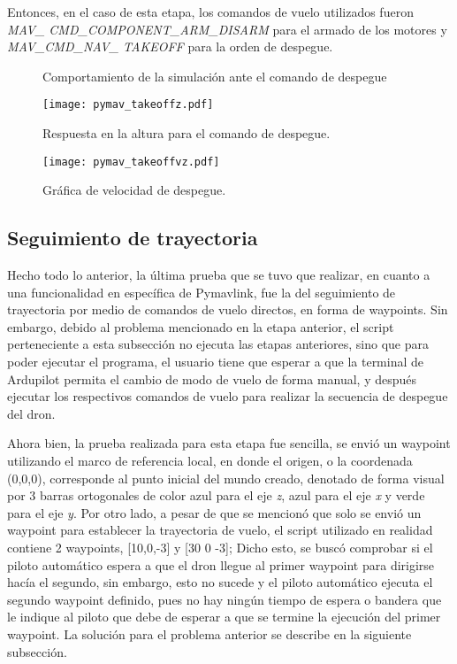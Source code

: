 Entonces, en el caso de esta etapa, los comandos de vuelo utilizados fueron \textit{MAV\_ CMD\_COMPONENT\_ARM\_DISARM} para el armado de los motores y \textit{MAV\_CMD\_NAV\_ TAKEOFF} para la orden de despegue.

\begin{figure}[ht]
    \centering
    \hfill
    \caption{Comportamiento de la simulación ante el comando de despegue}
    \label{fig:pymav_takeoff}
\end{figure}

\begin{figure}[ht]
    \centering
    \texttt{[image: pymav\_takeoffz.pdf]}
    \caption{Respuesta en la altura para el comando de despegue.}
    \label{fig:pymav_takeoffz}
\end{figure}

\begin{figure}[ht]
    \centering
    \texttt{[image: pymav\_takeoffvz.pdf]}
    \caption{Gráfica de velocidad de despegue.}
    \label{fig:pymav_takeoffvz}
\end{figure}

\subsection{Seguimiento de trayectoria}

Hecho todo lo anterior, la última prueba que se tuvo que realizar, en cuanto a una funcionalidad en específica de Pymavlink, fue la del seguimiento de trayectoria por medio de comandos de vuelo directos, en forma de waypoints. Sin embargo, debido al problema mencionado en la etapa anterior, el script perteneciente a esta subsección no ejecuta las etapas anteriores, sino que para poder ejecutar el programa, el usuario tiene que esperar a que la terminal de Ardupilot permita el cambio de modo de vuelo de forma manual, y después ejecutar los respectivos comandos de vuelo para realizar la secuencia de despegue del dron.

Ahora bien, la prueba realizada para esta etapa fue sencilla, se envió un waypoint utilizando el marco de referencia local, en donde el origen, o la coordenada (0,0,0), corresponde al punto inicial del mundo creado, denotado de forma visual por 3 barras ortogonales de color azul para el eje \textit{z}, azul para el eje \textit{x} y verde para el eje \textit{y}. Por otro lado, a pesar de que se mencionó que solo se envió un waypoint para establecer la trayectoria de vuelo, el script utilizado en realidad contiene 2 waypoints, [10,0,-3] y [30 0 -3]; Dicho esto, se buscó comprobar si el piloto automático espera a que el dron llegue al primer waypoint para dirigirse hacía el segundo, sin embargo, esto no sucede y el piloto automático ejecuta el segundo waypoint definido, pues no hay ningún tiempo de espera o bandera que le indique al piloto que debe de esperar a que se termine la ejecución del primer waypoint. La solución para el problema anterior se describe en la siguiente subsección.

